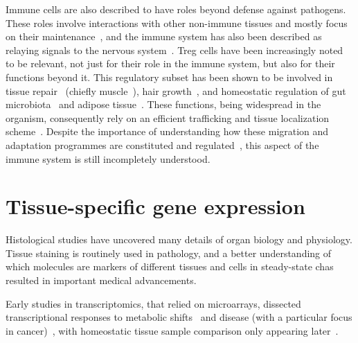 Immune cells are also described to have roles beyond defense against pathogens. These roles involve interactions with other non-immune tissues and mostly focus on their maintenance~\citep{gordon_physiological_2017,laurent_immune-mediated_2017}, and the immune system has also been described as relaying signals to the nervous system~\citep{veiga-fernandes_neuro-immune_2016}. Treg cells have been increasingly noted to be relevant, not just for their role in the immune system, but also for their functions beyond it. This regulatory subset has been shown to be involved in tissue repair~\citep{li_regulatory_2018} (chiefly muscle~\citep{burzyn_special_2013}), hair growth~\citep{ali_regulatory_2017}, and homeostatic regulation of gut microbiota~\citep{cebula_thymus-derived_2013} and adipose tissue~\citep{cipolletta_adipose_2014,sharma_emerging_2018}. These functions, being widespread in the organism, consequently rely on an efficient trafficking and tissue localization scheme~\citep{liston_homeostatic_2014}. Despite the importance of understanding how these migration and adaptation programmes are constituted and regulated~\citep{agace_tissue-tropic_2006}, this aspect of the immune system is still incompletely understood.



\section{Tissue-specific gene expression}  %
\label{section1.5}

Histological studies have uncovered many details of organ biology and physiology. Tissue staining is routinely used in pathology, and a better understanding of which molecules are markers of different tissues and cells in steady-state chas resulted in important medical advancements.

Early studies in transcriptomics, that relied on microarrays, dissected transcriptional responses to metabolic shifts~\citep{derisi_exploring_1997} and disease (with a particular focus in cancer)~\citep{rhodes_large-scale_2004}, with homeostatic tissue sample comparison only appearing later~\citep{shyamsundar_dna_2005}. 

